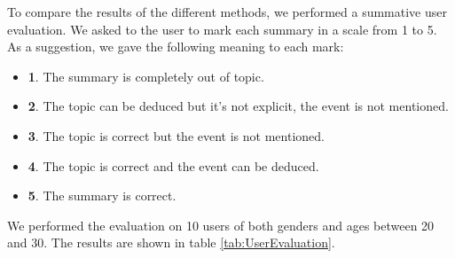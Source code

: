 

To compare the results of the different methods, we performed a summative user evaluation. We asked to the user to mark each summary in a scale from 1 to 5. As a suggestion, we gave the following meaning to each mark:
\begin{itemize}
\item \textbf{1}. The summary is completely out of topic.
\item \textbf{2}. The topic can be deduced but it's not explicit, the event is not mentioned.
\item \textbf{3}. The topic is correct but the event is not mentioned.
\item \textbf{4}. The topic is correct and the event can be deduced.
\item \textbf{5}. The summary is correct.
\end{itemize}

We performed the evaluation on 10 users of both genders and ages between 20 and 30. The results are shown in table \ref{tab:UserEvaluation}.